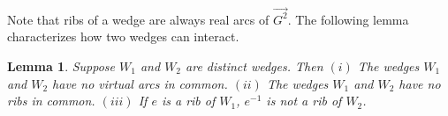 \documentclass[12pt,letterpaper,oneside]{book}
\newtheorem{lemma}[theorem]{Lemma}
\begin{document}
Note that ribs of a wedge are always real arcs of $\vec{G^2}$.  
The following lemma characterizes how two wedges can interact. 
 
\begin{lemma}\label{lemwedge} Suppose $W_1$ and $W_2$ are distinct wedges.  Then \newline 
$(i)$  The wedges $W_1$ and $W_2$ have no virtual arcs in common.  \newline 
$(ii)$  The wedges $W_1$ and $W_2$ have no ribs in common.\newline   
$(iii)$  If $e$ is a rib of $W_1$, $e^{-1}$ is not a rib of $W_2$.
\end{lemma} 
\end{document}
